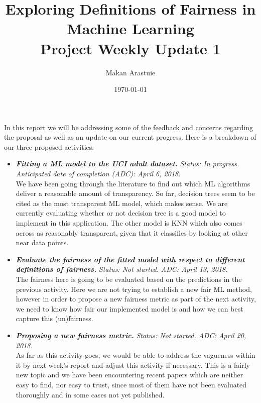 \documentclass[11pt]{article}
\begin{document}
\title{%
  Exploring Definitions of Fairness in Machine Learning \\ \vspace{5mm}
  \large Project Weekly Update 1}
\author{Makan Arastuie}
\date{\today}
\maketitle


In this report we will be addressing some of the feedback and concerns regarding the proposal as well as an update on our current progress. Here is a breakdown of our three proposed activities:

\begin{itemize}

\item \textbf{\textit{Fitting a ML model to the UCI adult dataset.}} \textit{Status: In progress.} \textit{Anticipated date of completion (ADC): April 6, 2018.} \\
We have been going through the literature to find out which ML algorithms deliver a reasonable amount of transparency. So far, decision trees seem to be cited as the most transparent ML model, which makes sense. We are currently evaluating whether or not decision tree is a good model to implement in this application. The other model is KNN which also comes across as reasonably transparent, given that it classifies by looking at other near data points.

\item \textbf{\textit{Evaluate the fairness of the fitted model with respect to different definitions of fairness.}} \textit{Status: Not started.} \textit{ADC: April 13, 2018.} \\
The fairness here is going to be evaluated based on the predictions in the previous activity. Here we are not trying to establish a new fair ML method, however in order to propose a new fairness metric as part of the next activity, we need to know how fair our implemented model is and how we can best capture this (un)fairness.


\item \textbf{\textit{Proposing a new fairness metric.}} \textit{Status: Not started.} \textit{ADC: April 20, 2018.} \\
As far as this activity goes, we would be able to address the vagueness within it by next week's report and adjust this activity if necessary. This is a fairly new topic and we have been encountering recent papers which are neither easy to find, nor easy to trust, since most of them have not been evaluated thoroughly and in some cases not yet published.
\end{itemize} 
\end{document}
